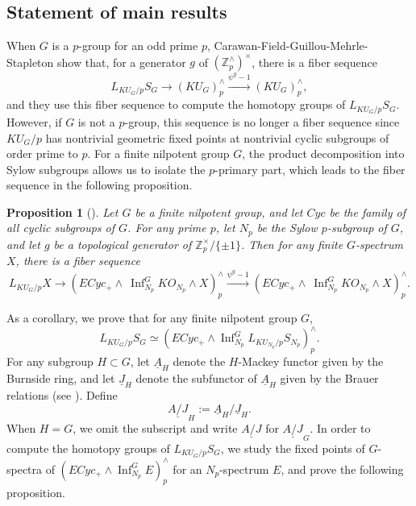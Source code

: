 \documentclass{amsart}
\theoremstyle{plain}
\newtheorem{proposition}[theorem]{Proposition}
\theoremstyle{definition}
\theoremstyle{remark}
\begin{document}
\subsection{Statement of main results}
When $G$ is a $p$-group for an odd prime $p$, Carawan-Field-Guillou-Mehrle-Stapleton\cite{carawan2023homotopy} show that, for a generator $g$ of $(\mathbb{Z}_p^\wedge)^\times$, there is a fiber sequence
\[
L_{KU_G/p}S_G \longrightarrow {(KU_{G})}_{p}^{\wedge}\overset{\psi^g-1}{\longrightarrow} {(KU_{G})}_p^{\wedge},
\]
and they use this fiber sequence to compute the homotopy groups of $L_{KU_G/p}S_G$. However, if $G$ is not a $p$-group, this sequence is no longer a fiber sequence since $KU_G/p$ has nontrivial geometric fixed points at nontrivial cyclic subgroups of order prime to $p$. For a finite nilpotent group $G$, the product decomposition into Sylow subgroups allows us to isolate the $p$-primary part, which leads to the fiber sequence in the following proposition.

\begin{proposition}[]\label{IntroThm:KU_G/p local sphere I}
    Let $G$ be a finite nilpotent group, and let $Cyc$ be the family of all cyclic subgroups of $G$. For any prime $p$, let $N_p$ be the Sylow $p$-subgroup of $G$, and let $g$ be a topological generator of $\mathbb{Z}_p^{\times}/\{\pm 1\}$. Then for any finite $G$-spectrum $X$, there is a fiber sequence 
    \[
    L_{KU_G/p}X \longrightarrow (ECyc_+\wedge\ \operatorname{Inf}_{N_p}^G KO_{N_p}\wedge X)_p^{\wedge}\overset{\psi^g-1}{\longrightarrow} (ECyc_+\wedge\ \operatorname{Inf}_{N_p}^G KO_{N_p}\wedge X)_p^{\wedge} .
    \]
\end{proposition}

As a corollary, we prove that for any finite nilpotent group $G$,
    \[    
    L_{KU_G/p}S_G\simeq (ECyc_+\wedge \operatorname{Inf}_{N_p}^G L_{KU_{N_p}/p}S_{N_p})_p^{\wedge}. 
    \] 
For any subgroup $H\subset G$, let $\underline{A}_H$ denote the $H$-Mackey functor given by the Burnside ring, and let $\underline{J}_H$ denote the subfunctor of $\underline{A}_H$ given by the Brauer relations (see ). Define
\[ \underline{A/J}_H:=\underline{A}_H/\underline{J}_H .\]
When $H=G$, we omit the subscript and write $\underline{A/J}$ for $\underline{A/J}_G$. In order to compute the homotopy groups of $L_{KU_G/p}S_G$, we study the fixed points of $G$-spectra of $(ECyc_+\wedge \operatorname{Inf}_{N_p}^G E)_p^\wedge$ for an $N_p$-spectrum $E$, and prove the following proposition.
\end{document}
